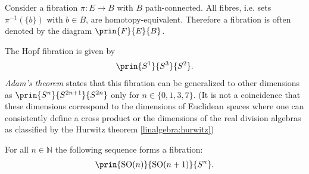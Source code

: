     \begin{property}
        Consider a fibration $\pi:E\rightarrow B$ with $B$ path-connected. All fibres, i.e. sets $\pi^{-1}(\{b\})$ with $b\in B$, are homotopy-equivalent. Therefore a fibration is often denoted by the diagram $\prin{F}{E}{B}$.
    \end{property}

    \begin{example}
        The Hopf fibration is given by
        \begin{gather}
            \prin{S^1}{S^3}{S^2}.
        \end{gather}
        \textit{Adam's theorem} states that this fibration can be generalized to other dimensions as $\prin{S^n}{S^{2n+1}}{S^{2n}}$ only for $n\in\{0,1,3,7\}$. (It is not a coincidence that these dimensions correspond to the dimensions of Euclidean spaces where one can consistently define a cross product or the dimensions of the real division algebras as classified by the Hurwitz theorem \ref{linalgebra:hurwitz})
    \end{example}
    \begin{example}
        For all $n\in\mathbb{N}$ the following sequence forms a fibration:
        \begin{gather}
            \prin{\text{SO}(n)}{\text{SO}(n+1)}{S^n}.
        \end{gather}
    \end{example}

